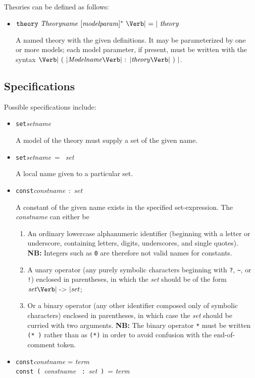 \documentclass[12pt]{article}
\newcommand{\keywd}[1]{\mbox{\texttt{#1}}\xspace}
\newcommand{\CONST}{\keywd{const}}
\newcommand{\SET}{\keywd{set}}
\newcommand{\THEORY}{\keywd{theory}}
\newcommand{\metav}[1]{\mbox{\textit{#1}}\xspace}
\newcommand{\MIdentifier}{\metav{Modelname}}
\newcommand{\Setexp}{\metav{set}}
\newcommand{\MParam}{\metav{modelparam}}
\newcommand{\Term}{\metav{term}}
\newcommand{\Theoryexp}{\metav{theory}}
\newcommand{\COLON}{\mbox{\Verb| : |}}
\newcommand{\EQUALS}{\mbox{\Verb| = |}}
\newcommand{\LPAREN}{\mbox{\Verb| ( |}}
\newcommand{\RPAREN}{\mbox{\Verb| ) |}}
\newcommand{\TO}{\mbox{\Verb| -> |}}
\newcommand{\NB}{\textbf{NB: }}
\begin{document}
\noindent Theories can be defined as follows:
\begin{itemize}
\item $\THEORY\ \metav{Theoryname}\ [\MParam]^*\ \EQUALS\ \Theoryexp$

   A named theory with the given definitions.  It may be parameterized
   by one or more models; each model parameter, if present, must be written
   with the syntax $\LPAREN \MIdentifier \COLON \Theoryexp \RPAREN$.
\end{itemize}



\subsection{Specifications}
Possible
specifications include:
\begin{itemize}
\item \SET \metav{setname}

A model of the theory must supply a set of the given name.

\item \SET \metav{setname}\ = \ \Setexp

A local name given to a particular set.

\item \CONST \metav{constname}\ :\ \Setexp

A constant of the given name exists in the specified set-expression.
The \metav{constname} can either be
\begin{enumerate}
\item An ordinary lowercase alphanumeric identifier (beginning with a
  letter or underscore, containing letters, digits, underscores, and
  single quotes).
  \NB Integers such as \Verb|0| are therefore not valid names for constants.
\item A unary operator (any purely symbolic characters beginning with \Verb|?|, \Verb|~|, or \Verb|!|) enclosed in parentheses, in which the \Setexp should be of the form $\Setexp \TO \Setexp$;
\item Or a binary operator (any other identifier composed only of
  symbolic characters) enclosed in parentheses, in which case the
  \Setexp should be curried with two arguments.
  \NB The binary operator \Verb|*| must be written \Verb|(* )| rather than
  as \Verb|(*)| in order to avoid confusion with the end-of-comment token.
\end{enumerate}



\item \CONST \metav{constname} = \Term\\
      \CONST \LPAREN \metav{constname} \COLON \Setexp \RPAREN = \Term\\
      

\end{itemize}
\end{document}
